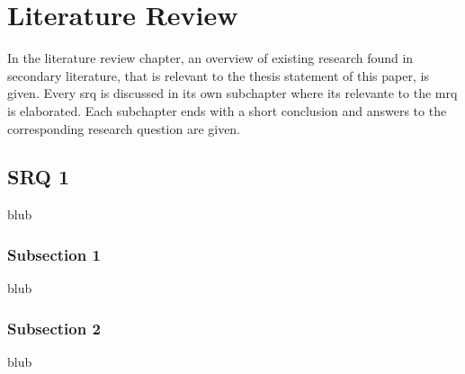
\chapter{Literature Review} %

\label{ChapterLiteratureReview} %

In the literature review chapter, an overview of existing research found in secondary literature, that is relevant to the thesis statement of this paper, is given. Every \gls{srq} is discussed in its own subchapter where its relevante to the \gls{mrq} is elaborated. Each subchapter ends with a short conclusion and answers to the corresponding research question are given.


\section{SRQ 1}

\label{SectionLiteratureReviewSR1}

blub


\subsection{Subsection 1}

blub



\subsection{Subsection 2}

blub



